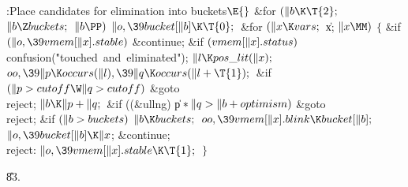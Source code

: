 \B{}:Place candidates for elimination into buckets\X${}%
\E{}$\6
\&{for} ${}(\|b\K\T{2};{}$ ${}\|b\Z\\{buckets};{}$ ${}\|b\PP){}$\1\5
${}\|o,\39\\{bucket}[\|b]\K\T{0};{}$\2\6
\&{for} ${}(\|x\K\\{vars};{}$ \|x; ${}\|x\MM){}$\5
${}\{{}$\1\6
\&{if} ${}(\|o,\39\\{vmem}[\|x].\\{stable}){}$\1\5
\&{continue};\2\6
\&{if} ${}(\\{vmem}[\|x].\\{status}){}$\1\5
\\{confusion}(\.{"touched\ and\ elimina}\)\.{ted"});\2\6
${}\|l\K\\{pos\_lit}(\|x);{}$\6
${}\\{oo},\39\|p\K\\{occurs}(\|l),\39\|q\K\\{occurs}(\|l+\T{1});{}$\6
\&{if} ${}(\|p>\\{cutoff}\W\|q>\\{cutoff}){}$\1\5
\&{goto} \\{reject};\2\6
${}\|b\K\|p+\|q;{}$\6
\&{if} ((\&{ullng}) \|p${}*\|q>\|b+\\{optimism}){}$\1\5
\&{goto} \\{reject};\2\6
\&{if} ${}(\|b>\\{buckets}){}$\1\5
${}\|b\K\\{buckets};{}$\2\6
${}\\{oo},\39\\{vmem}[\|x].\\{blink}\K\\{bucket}[\|b];{}$\6
${}\|o,\39\\{bucket}[\|b]\K\|x{}$;\5
\&{continue};\6
\4\\{reject}:\5
${}\|o,\39\\{vmem}[\|x].\\{stable}\K\T{1};{}$\6
\4${}\}{}$\2\par
\U83.\fi


